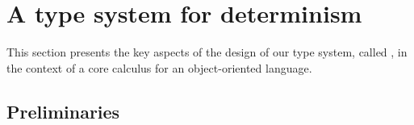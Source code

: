 \section{A type system for determinism}\label{design}

This section presents the key aspects of the design of our type system,
called \ourTypeSystem, in the context of a core calculus for an
object-oriented language.


\subsection{Preliminaries}

